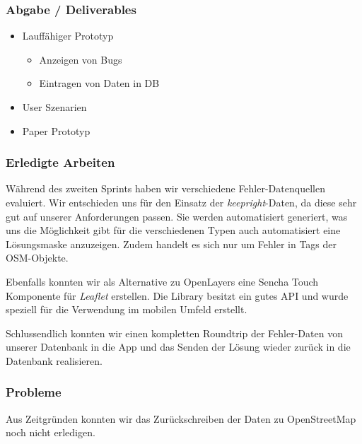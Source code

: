 \subsubsection{Abgabe / Deliverables}

\begin{itemize}
	\item Lauffähiger Prototyp
	\begin{itemize}
		\item Anzeigen von Bugs
		\item Eintragen von Daten in DB
	\end{itemize}
	\item User Szenarien
	\item Paper Prototyp
\end{itemize}

\subsubsection{Erledigte Arbeiten}
Während des zweiten Sprints haben wir verschiedene Fehler-Datenquellen evaluiert. Wir entschieden uns für den Einsatz der \emph{keepright}-Daten, da diese sehr gut auf unserer Anforderungen passen. Sie werden automatisiert generiert, was uns die Möglichkeit gibt für die verschiedenen Typen auch automatisiert eine Lösungsmaske anzuzeigen. Zudem handelt es sich nur um Fehler in Tags der OSM-Objekte.

Ebenfalls konnten wir als Alternative zu OpenLayers eine Sencha Touch Komponente für \emph{Leaflet} erstellen.
Die Library besitzt ein gutes API und wurde speziell für die Verwendung im mobilen Umfeld erstellt.

Schlussendlich konnten wir einen kompletten Roundtrip der Fehler-Daten von unserer Datenbank in die App und das Senden der Lösung wieder zurück in die Datenbank realisieren.

\subsubsection{Probleme}
Aus Zeitgründen konnten wir das Zurückschreiben der Daten zu OpenStreetMap noch nicht erledigen.